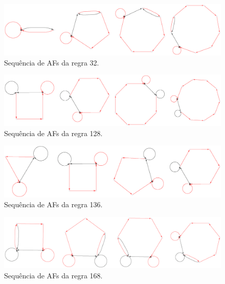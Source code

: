 \documentclass[12pt,a4paper]{article}
\begin{document}
\begin{figure}[H]
\begin{center}
\includegraphics[scale=0.60]{img/Rule32dfa.eps}
\caption{Sequência de AFs da regra 32.}
\label{fig:r32ta}
\end{center}
\end{figure}

\begin{figure}[H]
\begin{center}
\includegraphics[scale=0.60]{img/Rule128dfa.eps}
\caption{Sequência de AFs da regra 128.}
\label{fig:r128ta}
\end{center}
\end{figure}

\begin{figure}[H]
\begin{center}
\includegraphics[scale=0.55]{img/Rule136dfa.eps}
\caption{Sequência de AFs da regra 136.}
\label{fig:r136ta}
\end{center}
\end{figure}

\begin{figure}[H]
\begin{center}
\includegraphics[scale=0.47]{img/Rule168dfa.eps}
\caption{Sequência de AFs da regra 168.}
\label{fig:r168ta}
\end{center}
\end{figure}
\end{document}
